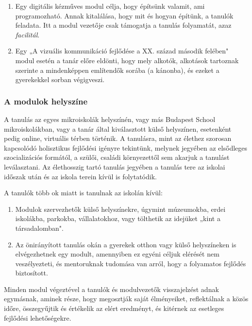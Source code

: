 \begin{enumerate}
  \item Egy digitális kézműves modul célja, hogy építsünk valamit, ami
        programozható. Annak kitalálása, hogy mit és hogyan építünk, a tanulók
        feladata. Itt a modul vezetője csak támogatja a tanulás folyamatát, azaz
        \emph{facilitál}.

  \item Egy „A vizuális kommunikáció fejlődése a XX. század második felében"
        modul esetén a tanár előre eldönti, hogy mely alkotók, alkotások
        tartoznak szerinte a mindenképpen említendők sorába (a kánonba), és
        ezeket a gyerekekkel sorban végigveszi.
\end{enumerate}

\subsubsection{A modulok helyszíne}

A tanulás az egyes mikroiskolák helyszínén, vagy más Budapest School
mikroiskolákban, vagy a tanár által kiválasztott külső helyszínen,
esetenként pedig online, virtuális térben történik. A tanulásra, mint az
élethez szorosan kapcsolódó holisztikus fejlődési igényre tekintünk,
melynek jegyében az elsődleges szocializációs formától, a szülői,
családi környezettől sem akarjuk a tanulást leválasztani. Az élethosszig
tartó tanulás jegyében a tanulás tere az iskolai időszak után és az
iskola terein kívül is folytatódik.

A tanulók több ok miatt is tanulnak az iskolán kívül:

\begin{enumerate}
  \item Modulok szervezhetők külső helyszínekre, úgymint múzeumokba, erdei
        iskolákba, parkokba, vállalatokhoz, vagy tölthetik az idejüket „kint a
        társadalomban".

  \item Az önirányított tanulás okán a gyerekek otthon vagy külső
        helyszíneken is elvégezhetnek egy modult, amennyiben ez egyéni céljuk
        elérését nem veszélyezteti, és mentoruknak tudomása van arról, hogy a
        folyamatos fejlődés biztosított.
\end{enumerate}

Minden modul végeztével a tanulók és modulvezetők visszajelzést adnak
egymásnak, aminek része, hogy megosztják saját élményeiket, reflektálnak
a közös időre, összegyűjtik és értékelik az elért eredményt, és kitérnek
az esetleges fejlődési lehetőségekre.

